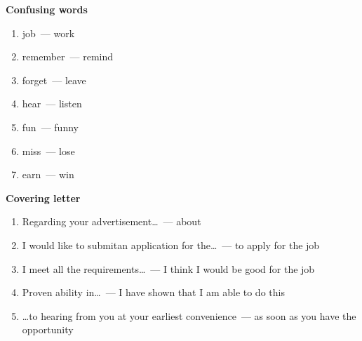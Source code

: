 \documentclass[10pt,a4paper]{article}
\begin{document}
\textbf{Confusing words}
\begin{enumerate}
\itemsep -0.2em
\item job~--- work
\item remember~--- remind
\item forget~--- leave
\item hear~--- listen
\item fun~--- funny
\item miss~--- lose
\item earn~--- win
\end{enumerate}

\par\medskip\textbf{Covering letter}
\begin{enumerate}
\itemsep -0.2em
\item Regarding your advertisement\dots ~--- about
\item I would like to submitan application for the\dots ~--- to apply for the job
\item I meet all the requirements\dots ~--- I think I would be good for the job
\item Proven ability in\dots ~--- I have shown that I am able to do this
\item \dots to hearing from you at your earliest convenience~--- as soon as you have the opportunity
\end{enumerate}
\end{document}
